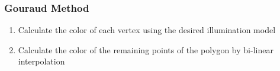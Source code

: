 \documentclass[a4paper]{article}
\begin{document}
\begin{flushleft}
\subsubsection*{Gouraud Method}
\begin{enumerate}
	\item Calculate the color of each vertex using the desired illumination model
	\item Calculate the color of the remaining points of the polygon by bi-linear interpolation
\end{enumerate}

\end{flushleft}
\end{document}
